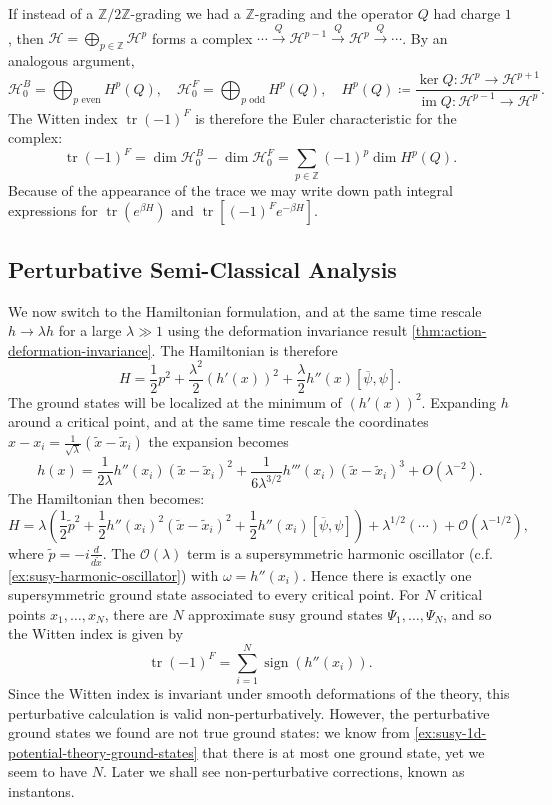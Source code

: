\documentclass{report}
\theoremstyle{plain}
\theoremstyle{definition}
\theoremstyle{remark}
\newcommand{\bZ}{\mathbb{Z}}
\newcommand{\cH}{\mathcal{H}}
\DeclareMathOperator{\im}{im}
\DeclareMathOperator{\tr}{tr}
\newcommand{\mc}{\mathcal}
\newcommand{\cnj}{\overline}
\newcommand{\lam}{\lambda}
\newcommand{\om}{\omega}
\newcommand{\FR}[2]{\frac{#1}{#2}}
\DeclareMathOperator{\Tr}{tr}
\DeclareMathOperator{\sign}{sign}
\begin{document}
If instead of a $\bZ/2\bZ$-grading we had a $\bZ$-grading and the
operator $Q$ had charge $1$, then $\cH = \bigoplus_{p \in \bZ} \cH^p$
forms a complex $\cdots \xrightarrow{Q} \cH^{p-1} \xrightarrow{Q}
\cH^p \xrightarrow{Q} \cdots$. By an analogous argument,
\[ \cH_0^B = \bigoplus_{p \text{ even}} H^p(Q), \quad \cH_0^F = \bigoplus_{p \text{ odd}} H^p(Q), \quad H^p(Q) \coloneqq \frac{\ker Q\colon \cH^p \to \cH^{p+1}}{\im Q\colon \cH^{p-1} \to \cH^p}. \]
The Witten index $\Tr(-1)^F$ is therefore the Euler characteristic for
the complex:
\[ \tr (-1)^F = \dim \cH_0^B - \dim \cH_0^F = \sum_{p \in \bZ} (-1)^p \dim H^p(Q). \]
Because of the appearance of the trace we may write down path integral
expressions for $\Tr(e^{\beta H})$ and $\Tr\left[ (-1)^Fe^{-\beta H}
  \right]$. 

\subsection{Perturbative Semi-Classical Analysis}
\label{sec:1d-susy-potential-theory}
We now switch to the Hamiltonian formulation, and at the same time
rescale $h\to \lam h$ for a large $\lam \gg 1$ using the deformation
invariance result \ref{thm:action-deformation-invariance}. The
Hamiltonian is therefore
\[H=\FR{1}{2}p^2+\FR{\lam^2}{2}(h'(x))^2+\FR{\lam}{2}h''(x)[\cnj\psi,\psi].\]
The ground states will be localized at the minimum of $(h'(x))^2$.
Expanding $h$ around a critical point, and at the same time rescale
the coordinates $x-x_i = \FR{1}{\sqrt\lam}(\tilde x-\tilde x_i)$ the
expansion becomes \[h(x) = \FR{1}{2\lam}h''(x_i)(\tilde x-\tilde
x_i)^2+\FR{1}{6\lam^{3/2}}h'''(x_i)(\tilde x-\tilde x_i)^3 +
O(\lam^{-2}).\] The Hamiltonian then becomes:
\[ H = \lam\left( \FR{1}{2}\tilde p^2 + \FR{1}{2}h''(x_i)^2(\tilde x-\tilde x_i)^2+\FR{1}{2}h''(x_i)\left[ \cnj\psi,\psi \right]\right)+\lam^{1/2}(\cdots)+\mc O(\lam^{-1/2}),\]
where $\tilde p = -i\FR{d}{d\tilde x}$. The $\mc O(\lam)$ term is a
supersymmetric harmonic oscillator (c.f.
\ref{ex:susy-harmonic-oscillator}) with $\om=h''(x_i)$. Hence there is
exactly one supersymmetric ground state associated to every critical
point. For $N$ critical points $x_1, \ldots, x_N$, there are $N$
approximate susy ground states $\Psi_1, \ldots, \Psi_N$, and so the
Witten index is given by
\[\Tr(-1)^F = \sum_{i=1}^N \sign(h''(x_i)).\]
Since the Witten index is invariant under smooth deformations of the
theory, this perturbative calculation is valid non-perturbatively.
However, the perturbative ground states we found are not true ground
states: we know from \ref{ex:susy-1d-potential-theory-ground-states}
that there is at most one ground state, yet we seem to have $N$. Later
we shall see non-perturbative corrections, known as instantons.
\end{document}
